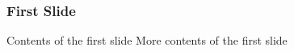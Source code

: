 \begin{frame}
\frametitle{First Slide}

Contents of the first slide
\vskip 0.15in
More contents of the first slide

\end{frame}



